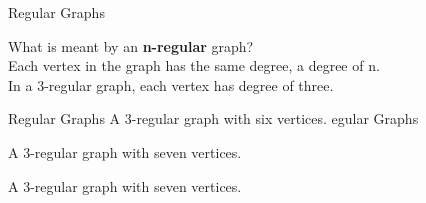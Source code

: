 


{Regular Graphs}
{

What is meant by an \textbf{n-regular} graph?\\
\bigskip
Each vertex in the graph has the same degree, a degree of n.
\\
\bigskip
In a 3-regular graph, each vertex has degree of three.

}



{Regular Graphs}
{
A 3-regular graph with six vertices.
egular Graphs}
{ 
A 3-regular graph with seven vertices.

A 3-regular graph with seven vertices.
}

